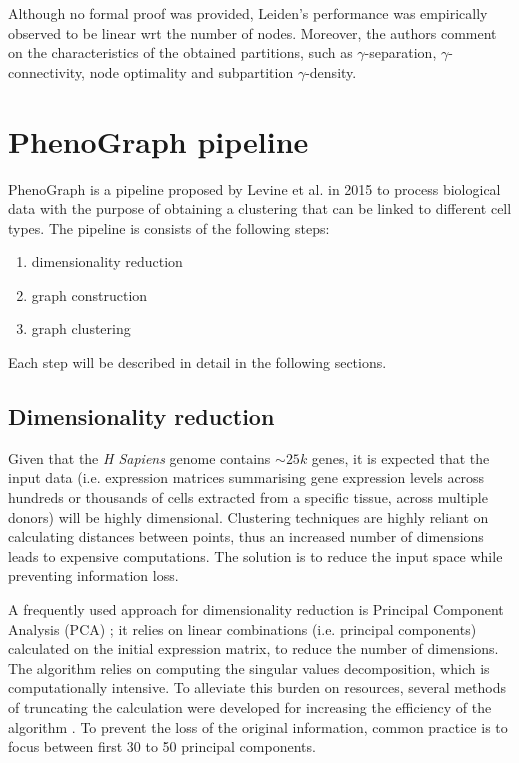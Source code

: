 Although no formal proof was provided, Leiden's performance was empirically observed to be linear wrt the number of nodes. Moreover, the authors comment on the characteristics of the obtained partitions, such as $\gamma$-separation, $\gamma$-connectivity, node optimality and subpartition $\gamma$-density.

\section{PhenoGraph pipeline}
PhenoGraph \cite{Levine2015} is a pipeline proposed by Levine et al. in 2015 to process biological data with the purpose of obtaining a clustering that can be linked to different cell types. The pipeline is consists of the following steps:
\begin{enumerate}
        \item dimensionality reduction
        \item graph construction
        \item graph clustering
\end{enumerate}

Each step will be described in detail in the following sections.

\subsection{Dimensionality reduction}
Given that the \textit{H Sapiens} genome contains $\sim 25k$ genes, it is expected that the input data (i.e. expression matrices summarising gene expression levels across hundreds or thousands of cells extracted from a specific tissue, across multiple donors) will be highly dimensional. Clustering techniques are highly reliant on calculating distances between points, thus an increased number of dimensions leads to expensive computations. The solution is to reduce the input space while preventing information loss.
    
A frequently used approach for dimensionality reduction is Principal Component Analysis (PCA) \cite{WOLD198737}; it relies on linear combinations (i.e. principal components) calculated on the initial expression matrix, to reduce the number of dimensions. The algorithm relies on computing the singular values decomposition, which is computationally intensive. To alleviate this burden on resources, several methods of truncating the calculation were developed for increasing the efficiency of the algorithm \cite{Baglama2016IRLBAFP}. To prevent the loss of the original information, common practice is to focus between first 30 to 50 principal components.


